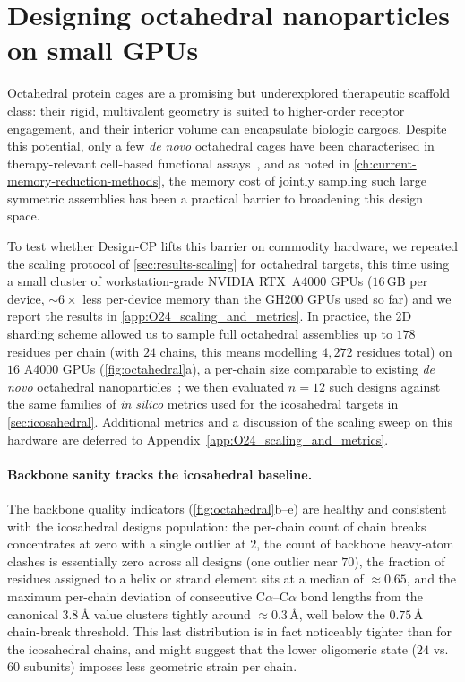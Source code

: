 \section{Designing octahedral nanoparticles on small GPUs}
\label{sec:results-democratization}

Octahedral protein cages are a promising but underexplored therapeutic scaffold class: their
rigid, multivalent geometry is suited to higher-order receptor engagement, and their 
interior volume can encapsulate biologic cargoes. Despite this potential, only a few 
\emph{de novo} octahedral cages have been characterised in therapy-relevant cell-based 
functional assays~\parencite{divine_designed_2021,yang_computational_2024}, and as noted in 
\cref{ch:current-memory-reduction-methods}, the memory cost of jointly sampling such large symmetric assemblies 
has been a practical barrier to broadening this design space.

To test whether Design-CP lifts this barrier on commodity hardware, we repeated the 
scaling protocol of \cref{sec:results-scaling} for octahedral targets, this time using a 
small cluster of workstation-grade NVIDIA RTX~A4000 GPUs ($16$\,GB per device,
${\sim}6\times$ less per-device memory than the GH200 GPUs used so far) and we report the 
results in \cref{app:O24_scaling_and_metrics}. In practice, the 2D sharding scheme allowed 
us to sample full octahedral assemblies up to $178$ residues per chain (with $24$ chains, 
this means modelling $4{,}272$ residues total) on $16$ A4000 GPUs 
(\cref{fig:octahedral}a), a per-chain size comparable to existing \emph{de novo} 
octahedral nanoparticles~\parencite{king_computational_2012}; we then evaluated $n=12$ such 
designs against the same families of \emph{in silico} metrics used for the icosahedral 
targets in \cref{sec:icosahedral}. Additional metrics and a discussion of the scaling 
sweep on this hardware are deferred to Appendix~\ref{app:O24_scaling_and_metrics}.

\paragraph{Backbone sanity tracks the icosahedral baseline.} 
The backbone quality indicators (\cref{fig:octahedral}b--e) are healthy and
consistent with the icosahedral designs population: the per-chain count of chain breaks 
concentrates at zero with a single outlier at $2$, the count of backbone heavy-atom clashes 
is essentially zero across all designs (one outlier near $70$), the fraction of residues 
assigned to a helix or strand element sits at a median of $\approx 0.65$, and the maximum 
per-chain deviation of consecutive C$\alpha$--C$\alpha$ bond lengths from the canonical 
$3.8$\,\AA{} value clusters tightly around $\approx 0.3$\,\AA{}, well below the 
$0.75$\,\AA{} chain-break threshold. This last distribution is in fact noticeably tighter 
than for the icosahedral chains, and might suggest that the lower oligomeric state 
($24$ vs.\ $60$ subunits) imposes less geometric strain per chain.

